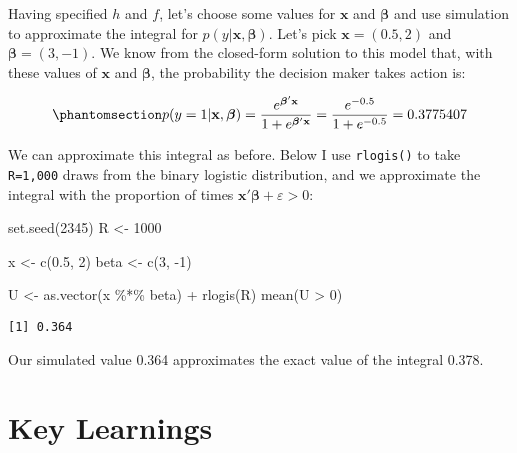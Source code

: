 \documentclass[
  letterpaper,
  DIV=11,
  numbers=noendperiod]{scrreprt}
\newenvironment{Shaded}{\begin{snugshade}}{\end{snugshade}}
\newcommand{\DecValTok}[1]{\textcolor[rgb]{0.68,0.00,0.00}{#1}}
\newcommand{\FloatTok}[1]{\textcolor[rgb]{0.68,0.00,0.00}{#1}}
\newcommand{\FunctionTok}[1]{\textcolor[rgb]{0.28,0.35,0.67}{#1}}
\newcommand{\NormalTok}[1]{\textcolor[rgb]{0.00,0.23,0.31}{#1}}
\newcommand{\OtherTok}[1]{\textcolor[rgb]{0.00,0.23,0.31}{#1}}
\newcommand{\SpecialCharTok}[1]{\textcolor[rgb]{0.37,0.37,0.37}{#1}}
\begin{document}
Having specified \(h\) and \(f\), let's choose some values for
\(\mathbf{x}\) and \(\boldsymbol{\beta}\) and use simulation to
approximate the integral for \(p(y|\mathbf{x},\boldsymbol{\beta})\).
Let's pick \(\mathbf{x}=(0.5, 2)\) and \(\boldsymbol{\beta}=(3,-1)\). We
know from the closed-form solution to this model that, with these values
of \(\mathbf{x}\) and \(\boldsymbol{\beta}\), the probability the
decision maker takes action is:

\begin{equation}\phantomsection\label{eq-binlogit_example}{
p(y=1 | \mathbf{x}, \boldsymbol{\beta}) = \frac{e^{\boldsymbol{\beta}'\mathbf{x}}}{1 + e^{\boldsymbol{\beta}'\mathbf{x}}} = \frac{e^{-0.5}}{1+e^{-0.5}} = 0.3775407
}\end{equation}

We can approximate this integral as before. Below I use
\texttt{rlogis()} to take \texttt{R=1,000} draws from the binary
logistic distribution, and we approximate the integral with the
proportion of times \(\mathbf{x}'\boldsymbol{\beta}+ \varepsilon > 0\):

\begin{Shaded}
\begin{Highlighting}[]
\FunctionTok{set.seed}\NormalTok{(}\DecValTok{2345}\NormalTok{)}
\NormalTok{R }\OtherTok{\textless{}{-}} \DecValTok{1000}

\NormalTok{x    }\OtherTok{\textless{}{-}} \FunctionTok{c}\NormalTok{(}\FloatTok{0.5}\NormalTok{, }\DecValTok{2}\NormalTok{)}
\NormalTok{beta }\OtherTok{\textless{}{-}} \FunctionTok{c}\NormalTok{(}\DecValTok{3}\NormalTok{, }\SpecialCharTok{{-}}\DecValTok{1}\NormalTok{)}

\NormalTok{U }\OtherTok{\textless{}{-}} \FunctionTok{as.vector}\NormalTok{(x }\SpecialCharTok{\%*\%}\NormalTok{ beta) }\SpecialCharTok{+} \FunctionTok{rlogis}\NormalTok{(R)}
\FunctionTok{mean}\NormalTok{(U }\SpecialCharTok{\textgreater{}} \DecValTok{0}\NormalTok{)}
\end{Highlighting}
\end{Shaded}

\begin{verbatim}
[1] 0.364
\end{verbatim}

Our simulated value 0.364 approximates the exact value of the integral
0.378.

\section{Key Learnings}\label{key-learnings}
\end{document}
